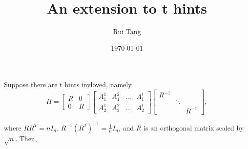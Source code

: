 \documentclass[12pt]{article}
\title{An extension to t hints}
\author{Rui Tang}
\date{\today}
\begin{document}
\maketitle

Suppose there are t hints invloved, namely
$$
H=
\begin{bmatrix}
R&0 \\
0&R
\end{bmatrix}
\begin{bmatrix}
A_{1}^1&A_{1}^2&\dots&A_{1}^t \\
A_{2}^1&A_{2}^2&\dots&A_{2}^t
\end{bmatrix}
\begin{bmatrix}
R^{-1} &  &  \\  
  & \ddots  &  \\
 &  & R^{-1}
\end{bmatrix},
$$

where $RR^{T}=nI_n$, $R^{-1}(R^T)^{-1}=\frac{1}{n}I_n$, and $R$ is an orthogonal matrix scaled by $\sqrt{n}$. Then,
\end{document}
